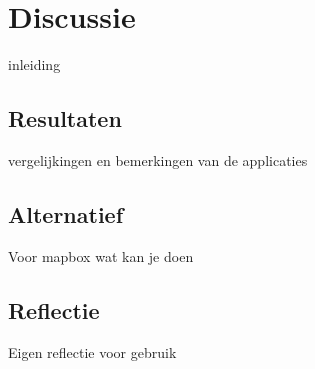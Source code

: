 

\section{Discussie}
\label{sec:discussie}

inleiding

\subsection{Resultaten}
\label{sec:resultaten}

vergelijkingen en bemerkingen van de applicaties

\subsection{Alternatief}
\label{sec:alternatief}

Voor mapbox wat kan je doen

\subsection{Reflectie}
\label{sec:reflectie}

Eigen reflectie voor gebruik